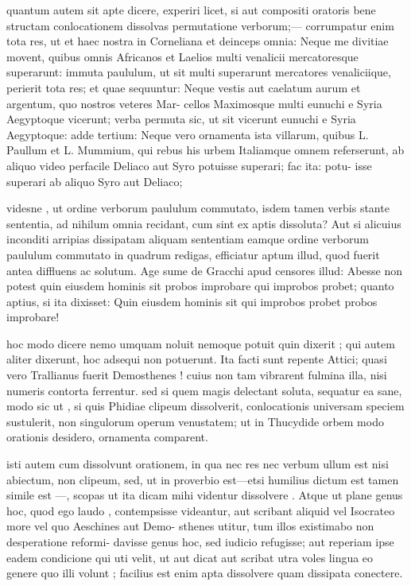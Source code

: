  quantum autem sit apte dicere, experiri licet, si aut compositi oratoris bene structam conlocationem dissolvas permutatione verborum;— corrumpatur enim tota res, ut et haec nostra in Corneliana et deinceps omnia: Neque me divitiae movent, quibus omnis Africanos et Laelios multi venalicii mercatoresque superarunt: immuta paululum, ut sit multi superarunt mercatores venaliciique, perierit tota res; et quae sequuntur: Neque vestis aut caelatum aurum et argentum, quo nostros veteres Mar- cellos Maximosque multi eunuchi e Syria Aegyptoque vicerunt; verba permuta sic, ut sit vicerunt eunuchi e Syria Aegyptoque: adde tertium: Neque vero ornamenta ista villarum, quibus L. Paullum et L. Mummium, qui rebus his urbem Italiamque omnem referserunt, ab aliquo video perfacile Deliaco aut Syro potuisse superari; fac ita: potu- isse superari ab aliquo Syro aut Deliaco;

 videsne , ut ordine verborum paululum commutato, isdem tamen verbis stante sententia, ad nihilum omnia recidant, cum sint ex aptis dissoluta? Aut si alicuius inconditi arripias dissipatam aliquam sententiam eamque ordine verborum paululum commutato in quadrum redigas, efficiatur aptum illud, quod fuerit antea diffluens ac solutum. Age sume de Gracchi apud censores illud: Abesse non potest quin eiusdem hominis sit probos improbare qui improbos probet; quanto aptius, si ita dixisset: Quin eiusdem hominis sit qui improbos probet probos improbare!

 hoc modo dicere nemo umquam noluit nemoque potuit quin dixerit ; qui autem aliter dixerunt, hoc adsequi non potuerunt. Ita facti sunt repente Attici; quasi vero Trallianus fuerit Demosthenes ! cuius non tam vibrarent fulmina illa, nisi numeris contorta ferrentur. sed si quem magis delectant soluta, sequatur ea sane, modo sic ut , si quis Phidiae clipeum dissolverit, conlocationis universam speciem sustulerit, non singulorum operum venustatem; ut in Thucydide orbem modo orationis desidero, ornamenta comparent.

 isti autem cum dissolvunt orationem, in qua nec res nec verbum ullum est nisi abiectum, non clipeum, sed, ut in proverbio est—etsi humilius dictum est tamen simile est —, scopas ut ita dicam mihi videntur dissolvere . Atque ut plane genus hoc, quod ego laudo , contempsisse videantur, aut scribant aliquid vel Isocrateo more vel quo Aeschines aut Demo- sthenes utitur, tum illos existimabo non desperatione reformi- davisse genus hoc, sed iudicio refugisse; aut reperiam ipse eadem condicione qui uti velit, ut aut dicat aut scribat utra voles lingua eo genere quo illi volunt ; facilius est enim apta dissolvere quam dissipata conectere.

